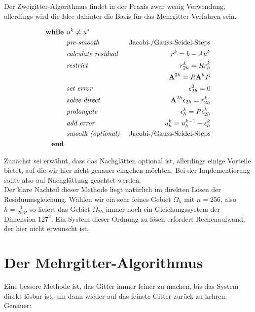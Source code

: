 Der Zweigitter-Algorithmus findet in der Praxis zwar wenig Verwendung, allerdings wird die Idee dahinter die Basis für das Mehrgitter-Verfahren sein.

\begin{eqnarray}
\textbf{while } 				&u^{k} \ne u^{*} \notag \\
&\textit{pre-smooth } 			&\textnormal{Jacobi-/Gauss-Seidel-Steps} \notag \\
&\textit{calculate residual }	&r^{k} = b - Au^{k} \notag \\
&\textit{restrict } 			&r^{k}_{2h}=Rr^{k}_{h} \notag \\
&								&{\textbf{A}}^{2h} = R{\textbf{A}}^{h}P \notag \\
&\textit{set error }			&\epsilon^{0}_{2h} = 0 \notag \\
&\textit{solve direct }			&{\textbf{A}}^{2h} \epsilon_{2h} = r^{k}_{2h} \notag \\
&\textit{prolongate }			&\epsilon^{k}_{h} = P\epsilon^{k}_{2h} \notag \\
&\textit{add error }			&u^{k}_{h} = u^{k-1}_{h} + \epsilon^{k}_{h} \notag \\
&\textit{smooth (optional) }	&\textnormal{Jacobi-/Gauss-Seidel-Steps} \notag \\
\textbf{end } \notag
\end{eqnarray}

Zunächst sei erwähnt, dass das Nachglätten optional ist, allerdings einige Vorteile bietet, auf die wir hier nicht genauer eingehen möchten. Bei der Implementierung sollte also auf Nachglättung geachtet werden. \\
Der klare Nachteil dieser Methode liegt natürlich im direkten Lösen der Residuumsgleichung. Wählen wir ein sehr feines Gebiet $\Omega_{h}$ mit $n = 256$, also $h = \frac {1} {256}$, so liefert das Gebiet $\Omega_{2h}$ immer noch ein Gleichungssystem der Dimension $127^{2}$. Ein System dieser Ordnung zu lösen erfordert Rechenaufwand, der hier nicht erwünscht ist. \\

\section{Der Mehrgitter-Algorithmus}

Eine bessere Methode ist, das Gitter immer feiner zu machen, bis das System direkt lösbar ist, um dann wieder auf das feinste Gitter zurück zu kehren. Genauer:

